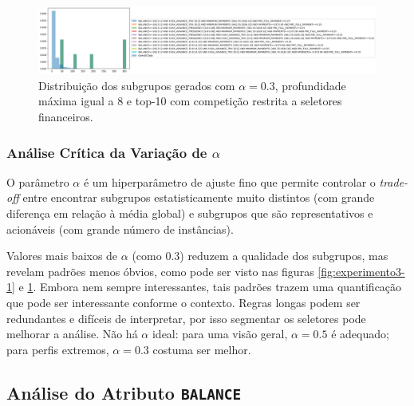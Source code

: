 \documentclass[12pt]{article}
\begin{document}
\begin{figure}[h] \centering 
    \includegraphics[width=1\textwidth]{imagens/experimento2.2.png}
    \caption{Distribuição dos subgrupos gerados com $\alpha = 0.3$, profundidade máxima igual a 8 e top-10 com competição restrita a seletores financeiros.}
    \label{fig:experimento3-2}
\end{figure}

\vspace{-0.5\baselineskip}

\subsubsection{Análise Crítica da Variação de $\alpha$}

\hspace{1.2cm}O parâmetro $\alpha$ é um hiperparâmetro de ajuste fino que permite controlar o \textit{trade-off} entre encontrar subgrupos estatisticamente muito distintos (com grande diferença em relação à média global) e subgrupos que são representativos e acionáveis (com grande número de instâncias).

Valores mais baixos de $\alpha$ (como 0.3) reduzem a qualidade dos subgrupos, mas revelam padrões menos óbvios, como pode ser visto nas figuras \ref{fig:experimento3-1} e \ref{fig:experimento3-2}. Embora nem sempre interessantes, tais padrões trazem uma quantificação que pode ser interessante conforme o contexto. Regras longas podem ser redundantes e difíceis de interpretar, por isso segmentar os seletores pode melhorar a análise. Não há $\alpha$ ideal: para uma visão geral, $\alpha = 0.5$ é adequado; para perfis extremos, $\alpha = 0.3$ costuma ser melhor.

\subsection{Análise do Atributo \texttt{BALANCE}}
\end{document}
